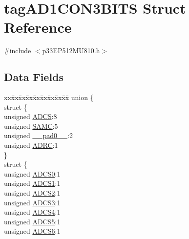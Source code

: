 \hypertarget{structtag_a_d1_c_o_n3_b_i_t_s}{}\section{tag\+A\+D1\+C\+O\+N3\+B\+I\+TS Struct Reference}
\label{structtag_a_d1_c_o_n3_b_i_t_s}


{\ttfamily \#include $<$p33\+E\+P512\+M\+U810.\+h$>$}

\subsection*{Data Fields}
\begin{DoxyCompactItemize}
\item 
\begin{tabbing}
xx\=xx\=xx\=xx\=xx\=xx\=xx\=xx\=xx\=\kill
union \{\\
\>struct \{\\
\>\>unsigned \hyperlink{structtag_a_d1_c_o_n3_b_i_t_s_a4726de302d42ce16fa478d46fa8b6547}{ADCS}:8\\
\>\>unsigned \hyperlink{structtag_a_d1_c_o_n3_b_i_t_s_a477fc5f81b5e1b617bfbf968c4402757}{SAMC}:5\\
\>\>unsigned \hyperlink{structtag_a_d1_c_o_n3_b_i_t_s_adf71f3d8410c1f1dbbc96680a92c49af}{\_\_pad0\_\_}:2\\
\>\>unsigned \hyperlink{structtag_a_d1_c_o_n3_b_i_t_s_a6829bc4287826c078b110f344d4585d4}{ADRC}:1\\
\>\} \\
\>struct \{\\
\>\>unsigned \hyperlink{structtag_a_d1_c_o_n3_b_i_t_s_afe527872723545abd9d6f12c56dfa7e7}{ADCS0}:1\\
\>\>unsigned \hyperlink{structtag_a_d1_c_o_n3_b_i_t_s_a8cf866f394fc998e3e6090d469196a67}{ADCS1}:1\\
\>\>unsigned \hyperlink{structtag_a_d1_c_o_n3_b_i_t_s_a325d1ff20bb28b63be0138eec6f5d58e}{ADCS2}:1\\
\>\>unsigned \hyperlink{structtag_a_d1_c_o_n3_b_i_t_s_a47049be7030de77b38edb565c1c28637}{ADCS3}:1\\
\>\>unsigned \hyperlink{structtag_a_d1_c_o_n3_b_i_t_s_a1d7c7c90f634a5b04060a45132223093}{ADCS4}:1\\
\>\>unsigned \hyperlink{structtag_a_d1_c_o_n3_b_i_t_s_a9ce7c5e43becc2e9902b34e7c68b5675}{ADCS5}:1\\
\>\>unsigned \hyperlink{structtag_a_d1_c_o_n3_b_i_t_s_afcd8237d69032806a10f8e02cee42508}{ADCS6}:1\\

\end{tabbing}
\end{DoxyCompactItemize}
